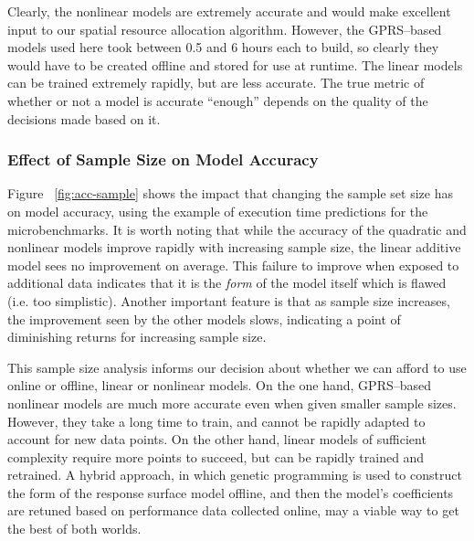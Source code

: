 
Clearly, the nonlinear models are extremely accurate and would make excellent input to our spatial resource allocation algorithm.  However, the GPRS--based models used here took between 0.5 and 6 hours each to build, so clearly they would have to be created offline and stored for use at runtime.  The linear models can be trained extremely rapidly, but are less accurate.  The true metric of whether or not a model is accurate ``enough'' depends on the quality of the decisions made based on it.

\subsubsection*{Effect of Sample Size on Model Accuracy}
\label{sec:eval:acc-sample}

Figure ~\ref{fig:acc-sample} shows the impact that changing the sample set size has on model accuracy, using the example of execution time predictions for the microbenchmarks.  It is worth noting that while the accuracy of the quadratic and  nonlinear models improve rapidly with increasing sample size, the linear additive model sees no improvement on average.  This failure to improve when exposed to additional data indicates that it is the {\em form} of the model itself which is flawed (i.e. too simplistic).  Another important feature is that as sample size increases, the improvement seen by the other models slows, indicating a point of diminishing returns for increasing sample size.

This sample size analysis informs our decision about whether we can afford to use online or offline, linear or nonlinear models.  On the one hand, GPRS--based nonlinear models are much more accurate even when given smaller sample sizes.  However, they take a long time to train, and cannot be rapidly adapted to account for new data points.  On the other hand, linear models of sufficient complexity require more points to succeed, but can be rapidly trained and retrained.  A hybrid approach, in which genetic programming is used to construct the form of the response surface model offline, and then the model's coefficients are retuned based on performance data collected online, may a viable way to get the best of both worlds.

